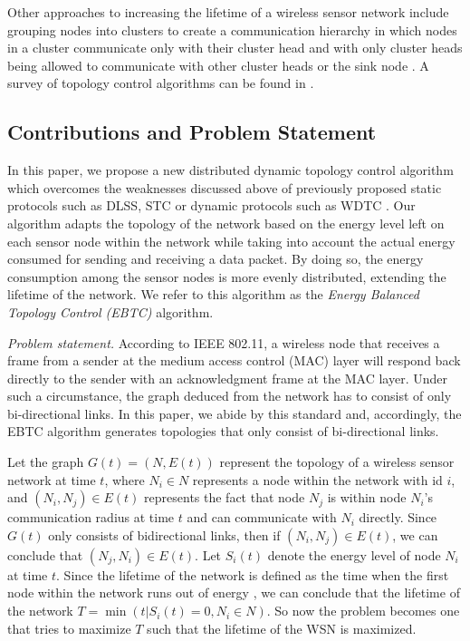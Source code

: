 \documentclass[journal,12pt,onecolumn]{IEEEtran}
\begin{document}
Other approaches to increasing the lifetime of a wireless sensor
network include grouping nodes into clusters to create a communication
hierarchy in which nodes in a cluster communicate only with their
cluster head and with only cluster heads being allowed to communicate with
other cluster heads or the sink node
\cite{AbaAna2009,KolPav2011}. A survey of topology control
algorithms can be found in \cite{MahMin2008,San2005}. 



\subsection{Contributions and Problem Statement}












In this paper, we propose a new distributed dynamic topology control algorithm
which overcomes the weaknesses discussed above of previously proposed
static protocols such as DLSS\cite{LiHou2005-1313}, STC \cite{SetGer2007} or dynamic protocols such as WDTC \cite{SunYua2011}. 
Our algorithm adapts the topology of the network based on the energy level
left on each sensor node within the network while taking into account
the actual energy consumed for sending and receiving a data
packet. By doing so, the energy consumption among the sensor nodes
is more evenly distributed, extending the lifetime of the network. We
refer to this algorithm as the {\em Energy Balanced Topology Control
  (EBTC)} algorithm.

{\em Problem statement.}
According to IEEE 802.11, a wireless node that receives a
frame from a sender at the medium access control (MAC) layer will
respond back directly to the sender with an acknowledgment frame at
the MAC layer. Under such a circumstance, the graph deduced from the
network has to consist of only bi-directional links. In this paper, we
abide by this standard and, accordingly, the EBTC algorithm generates
topologies that only consist of bi-directional links.

Let the graph $G(t)=(N,E(t))$ represent the topology of a wireless sensor
network at time $t$, where $N_i\in N$ represents a node within the
network with id $i$, and $(N_i,N_j)\in E(t)$ represents the fact
that node $N_j$ is within node $N_i$'s communication radius at time
$t$ and can communicate with $N_i$ directly. Since $G(t)$ only
consists of bidirectional links, then if $(N_i,N_j)\in E(t)$, we can
conclude that $(N_j,N_i)\in E(t)$. Let $S_i(t)$ denote the energy
level of node $N_i$ at time $t$. Since the lifetime of the network
is defined as the time when the first node within the network runs
out of energy \cite{SunYua2011}, we can conclude that the
lifetime of the network $T=\min(t|S_i(t)=0,N_i\in N)$. So now the
problem becomes one that tries to maximize $T$ such that the
lifetime of the WSN is maximized.
\end{document}
